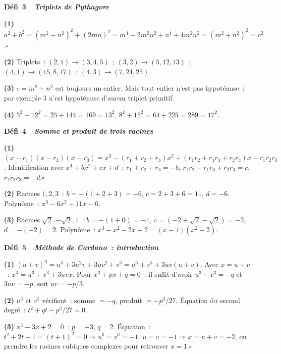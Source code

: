 \noindent{}
{\color{BO}\bfseries\small D\'efi~3~\textendash\ \textit{Triplets de Pythagore}}
\par\smallskip

\textbf{(1)} $a^2+b^2=(m^2-n^2)^2+(2mn)^2=m^4-2m^2n^2+n^4+4m^2n^2=(m^2+n^2)^2=c^2$.\hfill$\square$

\textbf{(2)} Triplets~:
$(2,1)\to(3,4,5)$~; $(3,2)\to(5,12,13)$~;
$(4,1)\to(15,8,17)$~; $(4,3)\to(7,24,25)$.

\textbf{(3)} $c=m^2+n^2$ est toujours un entier. Mais tout entier n'est pas hypot\'enuse~:
par exemple $3$ n'est hypot\'enuse d'aucun triplet primitif.

\textbf{(4)} $5^2+12^2=25+144=169=13^2$.\checkmark\quad
$8^2+15^2=64+225=289=17^2$.\checkmark

\noindent{}
{\color{BO}\bfseries\small D\'efi~4~\textendash\ \textit{Somme et produit de trois racines}}
\par\smallskip

\textbf{(1)} $(x-r_1)(x-r_2)(x-r_3)=x^3-(r_1+r_2+r_3)x^2
+(r_1r_2+r_1r_3+r_2r_3)x-r_1r_2r_3$.
Identification avec $x^3+bx^2+cx+d$~:
$r_1+r_2+r_3=-b$, $r_1r_2+r_1r_3+r_2r_3=c$, $r_1r_2r_3=-d$.\hfill$\square$

\textbf{(2)} Racines $1,2,3$~: $b=-(1+2+3)=-6$, $c=2+3+6=11$, $d=-6$.
Polyn\^ome~: $x^3-6x^2+11x-6$.

\textbf{(3)} Racines $\sqrt{2},-\sqrt{2},1$~: $b=-(1+0)=-1$, $c=(-2+\sqrt{2}-\sqrt{2})=-2$,
$d=-(-2)=2$. Polyn\^ome~: $x^3-x^2-2x+2=(x-1)(x^2-2)$.

\noindent{}
{\color{BO}\bfseries\small D\'efi~5~\textendash\ \textit{M\'ethode de Cardano~: introduction}}
\par\smallskip

\textbf{(1)} $(u+v)^3=u^3+3u^2v+3uv^2+v^3=u^3+v^3+3uv(u+v)$.
Avec $x=u+v$~: $x^3=u^3+v^3+3uvx$.
Pour $x^3+px+q=0$~: il suffit d'avoir $u^3+v^3=-q$ et $3uv=-p$, soit $uv=-p/3$.

\textbf{(2)} $u^3$ et $v^3$ v\'erifient~: somme $=-q$, produit $=-p^3/27$.
\'Equation du second degr\'e~: $t^2+qt-p^3/27=0$.

\textbf{(3)} $x^3-3x+2=0$~: $p=-3$, $q=2$.
\'Equation~: $t^2+2t+1=(t+1)^2=0\Rightarrow u^3=v^3=-1$.
$u=v=-1\Rightarrow x=u+v=-2$, ou prendre les racines cubiques complexes pour retrouver $x=1$.\hfill$\square$

